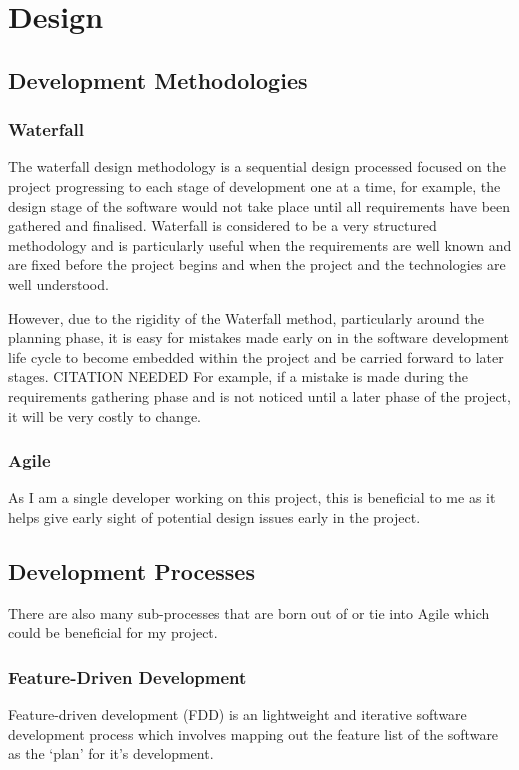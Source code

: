 

\chapter{Design}

\section{Development Methodologies}

\subsection{Waterfall}
The waterfall design methodology is a sequential design processed focused on the project progressing to each stage of development one at a time, for example, the design stage of the software would not take place until all requirements have been gathered and finalised.
Waterfall is considered to be a very structured methodology and is particularly useful when the requirements are well known and are fixed before the project begins and when the project and the technologies are well understood.

However, due to the rigidity of the Waterfall method, particularly around the planning phase, it is easy for mistakes made early on in the software development life cycle to become embedded within the project and be carried forward to later stages. CITATION NEEDED
For example, if a mistake is made during the requirements gathering phase and is not noticed until a later phase of the project, it will be very costly to change.

\subsection{Agile}
As I am a single developer working on this project, this is beneficial to me as it helps give early sight of potential design issues early in the project.


\section{Development Processes}
There are also many sub-processes that are born out of or tie into Agile which could be beneficial for my project.

\subsection{Feature-Driven Development}
Feature-driven development (FDD) is an lightweight and iterative software development process which involves mapping out the feature list of the software as the `plan' for it's development.


